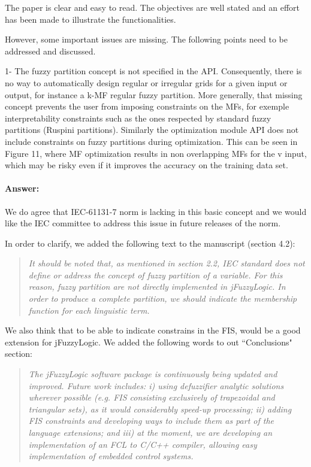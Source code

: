 \documentclass[10pt,a4paper]{article}
\begin{document}
The paper is clear and easy to read. 
The objectives are well stated and an effort has been made to illustrate the functionalities. 

However, some important issues are missing. 
The following points need to be addressed and discussed. 

1- The fuzzy partition concept is not specified in the API. 
Consequently, there is no way to automatically design regular or irregular grids for a given input or output, for instance a k-MF regular fuzzy partition. 
More generally, that missing concept prevents the user from imposing constraints on the MFs, for exemple interpretability constraints such as the ones respected by standard fuzzy partitions (Ruspini partitions). 
Similarly the optimization module API does not include constraints on fuzzy partitions during optimization. 
This can be seen in Figure 11, where MF optimization results in non overlapping MFs for the v input, which may be risky even if it improves the accuracy on the training data set.

\paragraph{Answer:}We do agree that IEC-61131-7 norm is lacking in this basic concept and we would like the IEC committee to address this issue in future releases of the norm.

In order to clarify, we added the following text to the manuscript (section 4.2):

\begin{quotation}
\textit{It should be noted that, as mentioned in section 2.2, IEC standard does not define or address the concept of fuzzy partition of a variable.
For this reason, fuzzy partition are not directly implemented in jFuzzyLogic.
In order to produce a complete partition, we should indicate the membership function for each linguistic term.
}\end{quotation}

We also think that to be able to indicate constrains in the FIS, would be a good extension for jFuzzyLogic.
We added the following words to out ``Conclusions" section:

\begin{quotation}\textit{
The jFuzzyLogic software package is continuously being updated and improved. 
Future work includes: 
	i) using defuzzifier analytic solutions wherever possible (e.g. FIS consisting exclusively of trapezoidal and triangular sets), as it would considerably speed-up processing; 
	ii) adding FIS constraints and developing ways to include them as part of the language extensions; and
	iii) at the moment, we are developing an implementation of an FCL to C/C++ compiler, allowing easy implementation of embedded control systems.
}\end{quotation}
\end{document}
